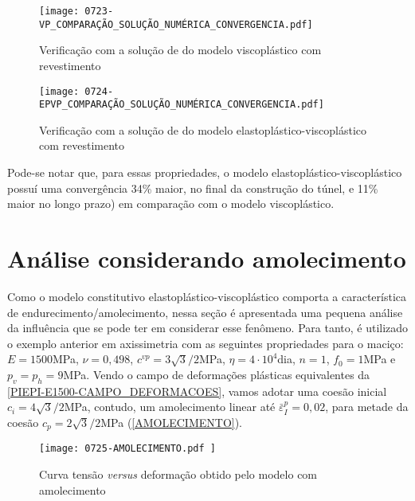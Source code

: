 \begin{figure}[H]
	\begin{center}
		\texttt{[image: 0723-VP\_COMPARAÇÃO\_SOLUÇÃO\_NUMÉRICA\_CONVERGENCIA.pdf]}
	\end{center}
	\caption{\label{VP_COMPARAÇÃO_SOLUÇÃO_NUMÉRICA_CONVERGENCIA}Verificação com a solução de  do modelo viscoplástico com revestimento}
\end{figure}

\begin{figure}[H]
	\begin{center}
		\texttt{[image: 0724-EPVP\_COMPARAÇÃO\_SOLUÇÃO\_NUMÉRICA\_CONVERGENCIA.pdf]}
	\end{center}
	\caption{\label{EPVP_COMPARAÇÃO_SOLUÇÃO_NUMÉRICA_CONVERGENCIA}Verificação com a solução de  do modelo elastoplástico-viscoplástico com revestimento}
\end{figure}

Pode-se notar que, para essas propriedades, o modelo elastoplástico-viscoplástico possuí uma convergência 34\% maior, no final da construção do túnel, e 11\% maior no longo prazo) em comparação com o modelo viscoplástico.

\section{Análise considerando amolecimento}

Como o modelo constitutivo elastoplástico-viscoplástico comporta a característica de endurecimento/amolecimento, nessa seção é apresentada uma pequena análise da influência que se pode ter em considerar esse fenômeno. Para tanto, é utilizado o exemplo anterior em axissimetria com as seguintes propriedades para o maciço: $E=1500$MPa, $\nu=0,498$, $c^{vp}=3\sqrt{3}/2$MPa, $\eta = 4 \cdot 10^4$dia, $n=1$, $f_0=1$MPa e $p_v=p_h=9$MPa. Vendo o campo de deformações plásticas equivalentes da \autoref{PIEPI-E1500-CAMPO_DEFORMACOES}, vamos adotar uma coesão inicial $c_i=4\sqrt{3}/2$MPa, contudo, um amolecimento linear até $\bar \varepsilon^p_{I} = 0,02$, para metade da coesão $c_p=2\sqrt{3}/2$MPa (\autoref{AMOLECIMENTO}).

\begin{figure}[H]
	\begin{center}
		\texttt{[image: 0725-AMOLECIMENTO.pdf
		]}
	\end{center}
	\caption{\label{AMOLECIMENTO}Curva tensão \textit{versus} deformação obtido pelo modelo com amolecimento}
\end{figure}

